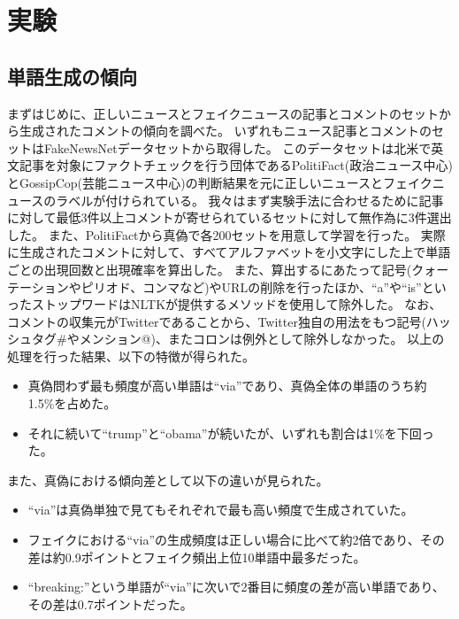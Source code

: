\section{実験}
\subsection{単語生成の傾向}
\label{subsec:trend}
まずはじめに、正しいニュースとフェイクニュースの記事とコメントのセットから生成されたコメントの傾向を調べた。
いずれもニュース記事とコメントのセットはFakeNewsNetデータセット\cite{Shu2018FakeNewsNetAD}から取得した。
このデータセットは北米で英文記事を対象にファクトチェックを行う団体であるPolitiFact(政治ニュース中心)とGossipCop(芸能ニュース中心)の判断結果を元に正しいニュースとフェイクニュースのラベルが付けられている。
我々はまず実験手法に合わせるために記事に対して最低3件以上コメントが寄せられているセットに対して無作為に3件選出した。
また、PolitiFactから真偽で各200セットを用意して学習を行った。
実際に生成されたコメントに対して、すべてアルファベットを小文字にした上で単語ごとの出現回数と出現確率を算出した。
また、算出するにあたって記号(クォーテーションやピリオド、コンマなど)やURLの削除を行ったほか、``a''や``is''といったストップワードはNLTK\cite{bird-loper-2004-nltk}が提供するメソッドを使用して除外した。
なお、コメントの収集元がTwitterであることから、Twitter独自の用法をもつ記号(ハッシュタグ\#やメンション@)、またコロンは例外として除外しなかった。
以上の処理を行った結果、以下の特徴が得られた。

\begin{itemize}
    \item 真偽問わず最も頻度が高い単語は``via''であり、真偽全体の単語のうち約1.5\%を占めた。
    \item それに続いて``trump''と``obama''が続いたが、いずれも割合は1\%を下回った。
\end{itemize}

また、真偽における傾向差として以下の違いが見られた。

\begin{itemize}
    \item ``via''は真偽単独で見てもそれぞれで最も高い頻度で生成されていた。
    \item フェイクにおける``via''の生成頻度は正しい場合に比べて約2倍であり、その差は約0.9ポイントとフェイク頻出上位10単語中最多だった。
    \item ``breaking:''という単語が``via''に次いで2番目に頻度の差が高い単語であり、その差は0.7ポイントだった。
\end{itemize}

